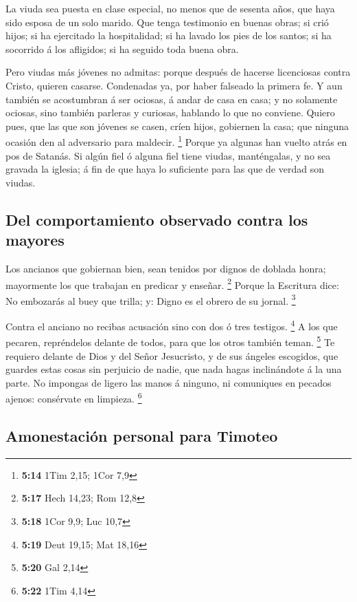  La viuda sea puesta en clase especial, no menos que de
sesenta años, que haya sido esposa de un solo marido.  Que
tenga testimonio en buenas obras; si crió hijos; si ha ejercitado la
hospitalidad; si ha lavado los pies de los santos; si ha socorrido á los
afligidos; si ha seguido toda buena obra.

 Pero viudas más jóvenes no admitas: porque después de
hacerse licenciosas contra Cristo, quieren casarse. 
Condenadas ya, por haber falseado la primera fe.  Y aun
también se acostumbran á ser ociosas, á andar de casa en casa; y no
solamente ociosas, sino también parleras y curiosas, hablando lo que no
conviene.  Quiero pues, que las que son jóvenes se casen,
críen hijos, gobiernen la casa; que ninguna ocasión den al adversario
para maldecir. \footnote{\textbf{5:14} 1Tim 2,15; 1Cor 7,9}
 Porque ya algunas han vuelto atrás en pos de Satanás.
 Si algún fiel ó alguna fiel tiene viudas, manténgalas, y
no sea gravada la iglesia; á fin de que haya lo suficiente para las que
de verdad son viudas.

\hypertarget{del-comportamiento-observado-contra-los-mayores}{%
\subsection{Del comportamiento observado contra los
mayores}\label{del-comportamiento-observado-contra-los-mayores}}

 Los ancianos que gobiernan bien, sean tenidos por dignos
de doblada honra; mayormente los que trabajan en predicar y enseñar.
\footnote{\textbf{5:17} Hech 14,23; Rom 12,8}  Porque la
Escritura dice: No embozarás al buey que trilla; y: Digno es el obrero
de su jornal. \footnote{\textbf{5:18} 1Cor 9,9; Luc 10,7}

 Contra el anciano no recibas acusación sino con dos ó tres
testigos. \footnote{\textbf{5:19} Deut 19,15; Mat 18,16}  A
los que pecaren, repréndelos delante de todos, para que los otros
también teman. \footnote{\textbf{5:20} Gal 2,14}  Te
requiero delante de Dios y del Señor Jesucristo, y de sus ángeles
escogidos, que guardes estas cosas sin perjuicio de nadie, que nada
hagas inclinándote á la una parte.  No impongas de ligero
las manos á ninguno, ni comuniques en pecados ajenos: consérvate en
limpieza. \footnote{\textbf{5:22} 1Tim 4,14}

\hypertarget{amonestaciuxf3n-personal-para-timoteo}{%
\subsection{Amonestación personal para
Timoteo}\label{amonestaciuxf3n-personal-para-timoteo}}

